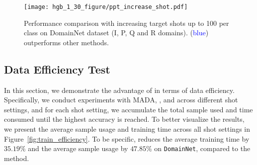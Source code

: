 
\begin{figure}[htbp]
    \centering
    \texttt{[image: hgb\_1\_30\_figure/ppt\_increase\_shot.pdf]}
    \caption{Performance comparison with increasing target shots up to 100 per class on DomainNet dataset (I, P, Q and R domains). \ourmethod{} (\textcolor{blue}{blue}) outperforms other methods.}
    \label{fig:all_increase_shots}
\end{figure}

\subsection{Data Efficiency Test} 
\label{section:data_efficient}
In this section, we demonstrate the advantage of \ourmethod{} in terms of data efficiency.
Specifically, we conduct experiments with MADA, \allsource{}, and \ourmethod{} across different shot settings, and for each shot setting, we accumulate the total sample used and time consumed until the highest accuracy is reached.
To better visualize the results, 
we present the average sample usage and training time across all shot settings in Figure~\ref{fig:train_efficiency}. %
To be specific, \ourmethod{} reduces the average training time by $35.19\%$ and the average sample usage by $47.85\%$ on \texttt{DomainNet}, compared to the \allsource{} method.




